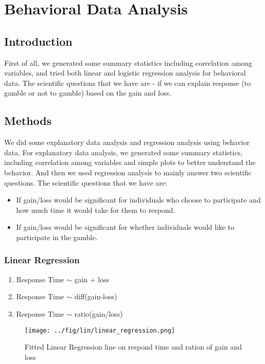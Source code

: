 \section{Behavioral Data Analysis}

\subsection{Introduction}
\noindent
First of all, we generated some summary statistics including correlation among variables, 
and tried both linear and logistic regression analysis for behavioral data. The scientific 
questions that we have are - if we can explain response (to gamble or not 
to gamble) based on the gain and loss.

\subsection{Methods}
\noindent
We did some explanatory data analysis and regression analysis using behavior 
data. For explanatory data analysis, we generated some summary statistics, 
including correlation among variables and simple plots to better understand 
the behavior. And then we used regression analysis to mainly answer two 
scientific questions. The scientific questions that we have are:
\begin{itemize}
\item If gain/loss would be significant for individuals who choose to 
participate and how much time it would take for them to respond.
\item If gain/loss would be significant for whether individuals would like to 
participate in the gamble. 
\end {itemize}

\subsubsection {Linear Regression}
\begin{enumerate}
\item  Response Time $\sim$ gain + loss
\item  Response Time $\sim$ diff(gain-loss)
\item  Response Time $\sim$ ratio(gain/loss)
\end {enumerate}

\begin{figure}[H] 
\centering \texttt{[image: ../fig/lin/linear\_regression.png]}	 
\caption{Fitted Linear Regression line on respond time and ration of gain and loss}
\end{figure}


